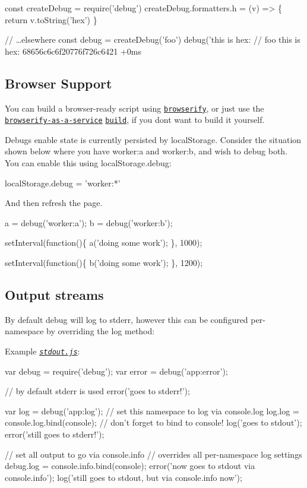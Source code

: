 \begin{DoxyCode}
const createDebug = require('debug')
createDebug.formatters.h = (v) => \{
  return v.toString('hex')
\}

// …elsewhere
const debug = createDebug('foo')
debug('this is hex: %
//   foo this is hex: 68656c6c6f20776f726c6421 +0ms
\end{DoxyCode}


\subsection*{Browser Support}

You can build a browser-\/ready script using \href{https://github.com/substack/node-browserify}{\tt browserify}, or just use the \href{https://wzrd.in/}{\tt browserify-\/as-\/a-\/service} \href{https://wzrd.in/standalone/debug@latest}{\tt build}, if you don\textquotesingle{}t want to build it yourself.

Debug\textquotesingle{}s enable state is currently persisted by {\ttfamily local\+Storage}. Consider the situation shown below where you have {\ttfamily worker\+:a} and {\ttfamily worker\+:b}, and wish to debug both. You can enable this using {\ttfamily local\+Storage.\+debug}\+:


\begin{DoxyCode}
localStorage.debug = 'worker:*'
\end{DoxyCode}


And then refresh the page.


\begin{DoxyCode}
a = debug('worker:a');
b = debug('worker:b');

setInterval(function()\{
  a('doing some work');
\}, 1000);

setInterval(function()\{
  b('doing some work');
\}, 1200);
\end{DoxyCode}


\subsection*{Output streams}

By default {\ttfamily debug} will log to stderr, however this can be configured per-\/namespace by overriding the {\ttfamily log} method\+:

Example \href{./examples/node/stdout.js}{\tt {\itshape stdout.\+js}}\+:


\begin{DoxyCode}
var debug = require('debug');
var error = debug('app:error');

// by default stderr is used
error('goes to stderr!');

var log = debug('app:log');
// set this namespace to log via console.log
log.log = console.log.bind(console); // don't forget to bind to console!
log('goes to stdout');
error('still goes to stderr!');

// set all output to go via console.info
// overrides all per-namespace log settings
debug.log = console.info.bind(console);
error('now goes to stdout via console.info');
log('still goes to stdout, but via console.info now');
\end{DoxyCode}


